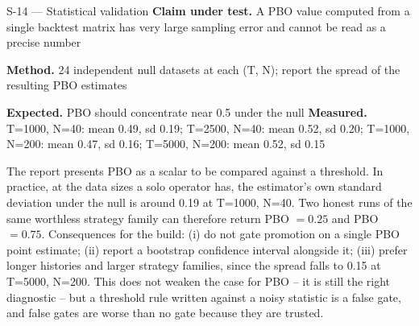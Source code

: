 \begin{caveat}{S-14 \; ---  Statistical validation}
\textbf{Claim under test.} A PBO value computed from a single backtest matrix has very large sampling error and cannot be read as a precise number

\textbf{Method.} 24 independent null datasets at each (T, N); report the spread of the resulting PBO estimates

\textbf{Expected.} PBO should concentrate near 0.5 under the null \quad \textbf{Measured.} T=1000, N=40: mean 0.49, sd 0.19; T=2500, N=40: mean 0.52, sd 0.20; T=1000, N=200: mean 0.47, sd 0.16; T=5000, N=200: mean 0.52, sd 0.15

The report presents PBO as a scalar to be compared against a threshold. In practice, at the data sizes a solo operator has, the estimator's own standard deviation under the null is around 0.19 at T=1000, N=40. Two honest runs of the same worthless strategy family can therefore return PBO $=0.25$ and PBO $=0.75$. Consequences for the build: (i) do not gate promotion on a single PBO point estimate; (ii) report a bootstrap confidence interval alongside it; (iii) prefer longer histories and larger strategy families, since the spread falls to 0.15 at T=5000, N=200. This does not weaken the case for PBO -- it is still the right diagnostic -- but a threshold rule written against a noisy statistic is a false gate, and false gates are worse than no gate because they are trusted.
\end{caveat}

